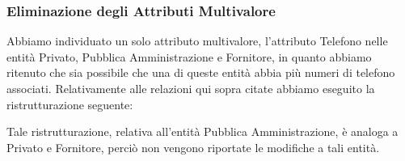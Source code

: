 \newpage
\subsubsection{Eliminazione degli Attributi Multivalore}

Abbiamo individuato un solo attributo multivalore, l'attributo Telefono nelle entità Privato, Pubblica Amministrazione e Fornitore, in quanto abbiamo ritenuto che sia possibile che una di queste entità abbia più numeri di telefono associati.
\newline
Relativamente alle relazioni qui sopra citate abbiamo eseguito la ristrutturazione seguente:
\newline\newline

\noindent{}
\newline\newline
Tale ristrutturazione, relativa all'entità Pubblica Amministrazione, è analoga a Privato e Fornitore, perciò non vengono riportate le modifiche a tali entità.
